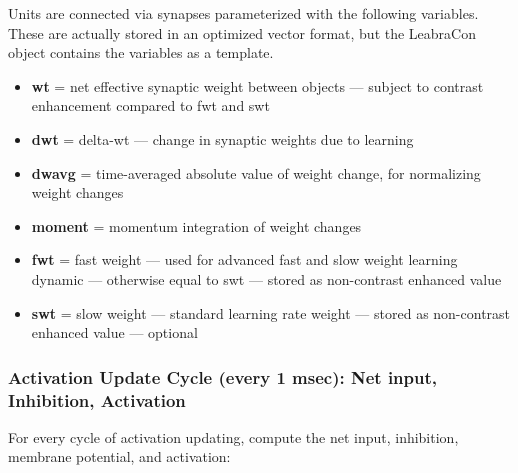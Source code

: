 Units are connected via synapses parameterized with the following
variables. These are actually stored in an optimized vector format, but
the LeabraCon object contains the variables as a template.

\begin{itemize}
\tightlist
\item
  \textbf{wt} = net effective synaptic weight between objects ---
  subject to contrast enhancement compared to fwt and swt
\item
  \textbf{dwt} = delta-wt --- change in synaptic weights due to
  learning
\item
  \textbf{dwavg} = time-averaged absolute value of weight change, for
  normalizing weight changes
\item
  \textbf{moment} = momentum integration of weight changes
\item
  \textbf{fwt} = fast weight --- used for advanced fast and slow weight
  learning dynamic --- otherwise equal to swt --- stored as
  non-contrast enhanced value
\item
  \textbf{swt} = slow weight --- standard learning rate weight ---
  stored as non-contrast enhanced value --- optional
\end{itemize}

\subsubsection{Activation Update Cycle (every 1 msec): Net input,
Inhibition,
Activation}\label{activation-update-cycle-every-1-msec-net-input-inhibition-activation}

For every cycle of activation updating, compute the net input,
inhibition, membrane potential, and activation:

